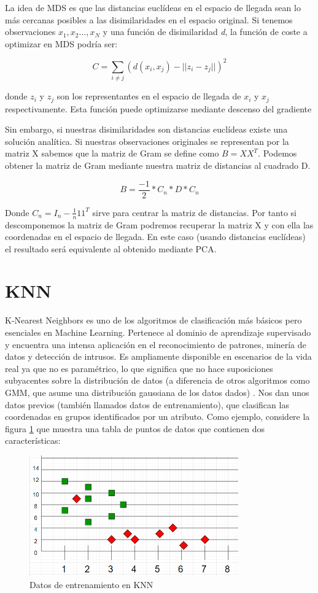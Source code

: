 La idea de MDS es que las distancias euclídeas en el espacio de llegada sean lo más cercanas posibles a las disimilaridades en el espacio original. Si tenemos observaciones $x_1, x_2..., x_N$ y una función de disimilaridad \textit{d}, la función de coste a optimizar en MDS podría ser:

\[C=\sum_{i \neq j}^{}(d(x_i,x_j)-||z_i-z_j||)^2\]

donde $z_i$ y $z_j$ son los representantes en el espacio de llegada de $x_i$ y $x_j$ respectivamente.
Esta función puede optimizarse mediante descenso del gradiente

Sin embargo, si nuestras disimilaridades son distancias euclídeas existe una solución analítica. Si nuestras observaciones originales se representan por la matriz X sabemos que la matriz de Gram se define como $B = XX^T$. Podemos obtener la matriz de Gram mediante nuestra matriz de distancias al cuadrado D.

\[B=\frac{-1}{2} * C_n * D * C_n\]

Donde $C_n = I_n - \frac{1}{n} 11^T$ sirve para centrar la matriz de distancias. Por tanto si descomponemos la matriz de Gram podremos recuperar la matriz X y con ella las coordenadas en el espacio de llegada. En este caso (usando distancias euclídeas) el resultado será equivalente al obtenido mediante PCA.

\section{KNN}
K-Nearest Neighbors es uno de los algoritmos de clasificación más básicos pero esenciales en Machine Learning. Pertenece al dominio de aprendizaje supervisado y encuentra una intensa aplicación en el reconocimiento de patrones, minería de datos y detección de intrusos.
Es ampliamente disponible en escenarios de la vida real ya que no es paramétrico, lo que significa que no hace suposiciones subyacentes sobre la distribución de datos (a diferencia de otros algoritmos como GMM, que asume una distribución gaussiana de los datos dados) .
Nos dan unos datos previos (también llamados datos de entrenamiento), que clasifican las coordenadas en grupos identificados por un atributo.
Como ejemplo, considere la figura \ref{fig:knn_01} que muestra una tabla de puntos de datos que contienen dos características:

\clearpage
\begin{figure}[h!]
	\begin{center}
	\includegraphics[angle=0,width=9cm]{Graficos/knn_01}
	\caption{Datos de entrenamiento en KNN}
	\label{fig:knn_01}
  \end{center}
\end{figure}

